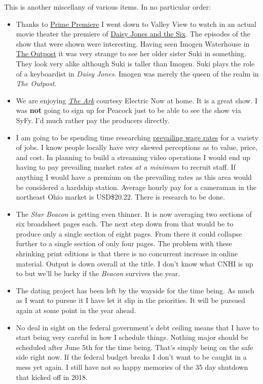 This is another miscellany of various items. In no particular order:

\begin{itemize}
\tightlist
\item
  Thanks to \href{https://www.primepremiere.amazon/}{Prime Premiere} I
  went down to Valley View to watch in an actual movie theater the
  premiere of
  \href{https://www.amazon.com/Daisy-Jones-Six-Teaser/dp/B0B8NS22S2/}{Daisy
  Jones and the Six}. The episodes of the show that were shown were
  interesting. Having seen Imogen Waterhouse in
  \href{https://www.electricnow.tv/node/295}{The Outpost} it was very
  strange to see her older sister Suki in something. They look very
  alike although Suki is taller than Imogen. Suki plays the role of a
  keyboardist in \emph{Daisy Jones}. Imogen was merely the queen of the
  realm in \emph{The Outpost}.
\item
  We are enjoying \href{https://www.electricnow.tv/shows/ark}{\emph{The
  Ark}} courtesy Electric Now at home. It is a great show. I was
  \textbf{not} going to sign up for Peacock just to be able to see the
  show via SyFy. I'd much rather pay the producers directly.
\item
  I am going to be spending time researching
  \href{https://flcdatacenter.com/}{prevailing wage rates} for a variety
  of jobs. I know people locally have very skewed perceptions as to
  value, price, and cost. In planning to build a streaming video
  operations I would end up having to pay prevailing market rates
  \emph{at a minimum} to recruit staff. If anything I would have a
  premium on the prevailing rates as this area would be considered a
  hardship station. Average hourly pay for a cameraman in the northeast
  Ohio market is USD\$20.22. There is research to be done.
\item
  The \emph{Star Beacon} is getting even thinner. It is now averaging
  two sections of six broadsheet pages each. The next step down from
  that would be to produce only a single section of eight pages. From
  there it could collapse further to a single section of only four
  pages. The problem with these shrinking print editions is that there
  is no concurrent increase in online material. Output is down overall
  at the title. I don't know what CNHI is up to but we'll be lucky if
  the \emph{Beacon} survives the year.
\item
  The dating project has been left by the wayside for the time being. As
  much as I want to pursue it I have let it slip in the priorities. It
  will be pursued again at some point in the year ahead.
\item
  No deal in sight on the federal government's debt ceiling means that I
  have to start being very careful in how I schedule things. Nothing
  major should be scheduled after June 5th for the time being. That's
  simply being on the safe side right now. If the federal budget breaks
  I don't want to be caught in a mess yet again. I still have not so
  happy memories of the 35 day shutdown that kicked off in 2018.
\end{itemize}
